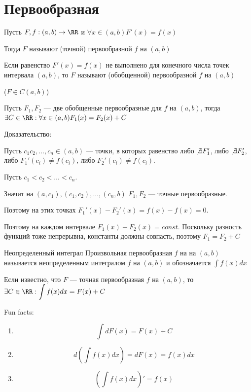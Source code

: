 \section{Первообразная}

\begin{defn}{}{}
    Пусть \( F, f: (a, b) \to \RR \) и \( \forall x \in (a, b) F'(x) = f(x) \)

    Тогда \( F \) называют (точной) первообразной \( f \) на \( (a, b) \)

    Если равенство \( F'(x) = f(x) \) не выполнено для конечного числа точек интервала \( (a, b) \),
    то \( F \) называют (обобщенной) первообразной \( f \) на \( (a, b) \)

    (\( F \in C(a, b) \))
\end{defn}

\begin{thrm}{}{}
    Пусть \( F_1, F_2 \) --- две обобщенные первообразные для \( f \) на \( (a, b) \),
    тогда \( \exists C \in \RR : \forall x \in (a, b) F_1(x) = F_2(x) + C \)
\end{thrm}

Доказательство:

Пусть \( c_1 c_2, \ldots, c_n \in (a, b) \) --- точки, в которых равенство
либо \( \not\exists F_1' \), либо \( \not\exists F_2' \), либо \( F_1'(c_i) \neq f(c_i) \),
либо \( F_2'(c_i) \neq f(c_i) \).

Пусть \( c_1 < c_2 < \ldots < c_n \).

Значит на \( (a, c_1), (c_1, c_2), \ldots, (c_n, b) \) \( F_1, F_2 \) --- точные первообразные.

Поэтому на этих точках \( F_1'(x) - F_2'(x)  = f(x) - f(x) = 0 \).

Поэтому на каждом интервале \( F_1(x) - F_2(x) = const \).
Поскольку разность функций тоже непрерывна, константы должны совпасть, поэтому \( F_1 = F_2 + C \)

\begin{defn}{Неопределенный интеграл}{}
    Произвольная первообразная \( f \) на на \( (a, b) \) называется неопределенным интегралом
    \( f \) на \( (a, b) \) и обозначается \( \displaystyle \int f(x) dx \)

    Если известно, что \( F \) --- точная первообразная \( f \) на \( (a, b) \),
    то \( \displaystyle \exists C \in \RR : \int f(x) dx = F(x) + C \)
\end{defn}

Fun facts:
\begin{enumerate}
    \item
        \[
            \int dF(x) = F(x) + C
        \]
    \item
        \[
            d \left( \int f(x) dx \right) = dF(x) = f(x) dx
        \]
    \item
        \[
            \left( \int f(x) dx \right)' = f(x)
        \]
\end{enumerate}

